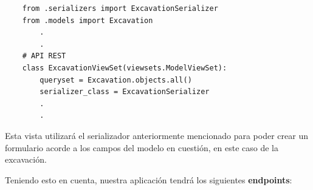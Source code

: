 \begin{itemize}
    \begin{verbatim}
    from .serializers import ExcavationSerializer
    from .models import Excavation
        .
        .
    # API REST
    class ExcavationViewSet(viewsets.ModelViewSet):
        queryset = Excavation.objects.all()
        serializer_class = ExcavationSerializer
        .
        .
    \end{verbatim}
        
        Esta vista utilizará el serializador anteriormente mencionado para poder crear
        un formulario acorde a los campos del modelo en cuestión, en este caso de la
        excavación.
    \end{itemize}

Teniendo esto en cuenta, nuestra aplicación tendrá los siguientes \textbf{endpoints}:

